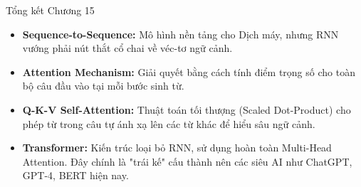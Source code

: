 \documentclass[aspectratio=169]{beamer}
\begin{document}
\begin{frame}{Tổng kết Chương 15}
    \begin{itemize}
        \item \textbf{Sequence-to-Sequence:} Mô hình nền tảng cho Dịch máy, nhưng RNN vướng phải nút thắt cổ chai về véc-tơ ngữ cảnh.
        \item \textbf{Attention Mechanism:} Giải quyết bằng cách tính điểm trọng số cho toàn bộ câu đầu vào tại mỗi bước sinh từ.
        \item \textbf{Q-K-V Self-Attention:} Thuật toán tối thượng (Scaled Dot-Product) cho phép từ trong câu tự ánh xạ lên các từ khác để hiểu sâu ngữ cảnh.
        \item \textbf{Transformer:} Kiến trúc loại bỏ RNN, sử dụng hoàn toàn Multi-Head Attention. Đây chính là "trái kế" cấu thành nên các siêu AI như ChatGPT, GPT-4, BERT hiện nay.
    \end{itemize}
\end{frame}
\end{document}
